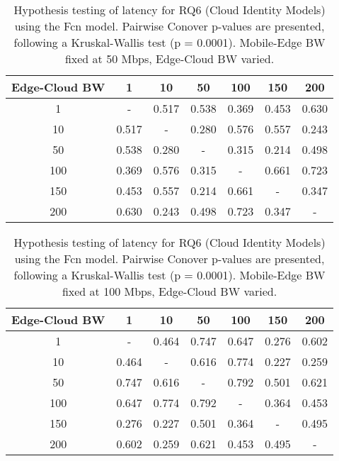 \begin{table}[H]
\caption{Hypothesis testing of latency for RQ6 (Cloud Identity Models) using the Fcn model. Pairwise Conover p-values are presented, following a Kruskal-Wallis test (p = 0.0001). Mobile-Edge BW fixed at 50 Mbps, Edge-Cloud BW varied.}
\centering
\begin{tabular}{c|cccccc}
Edge-Cloud BW & 1 & 10 & 50 & 100 & 150 & 200 \\
\hline
1 & - & 0.517 & 0.538 & 0.369 & 0.453 & 0.630 \\
10 & 0.517 & - & 0.280 & 0.576 & 0.557 & 0.243 \\
50 & 0.538 & 0.280 & - & 0.315 & 0.214 & 0.498 \\
100 & 0.369 & 0.576 & 0.315 & - & 0.661 & 0.723 \\
150 & 0.453 & 0.557 & 0.214 & 0.661 & - & 0.347 \\
200 & 0.630 & 0.243 & 0.498 & 0.723 & 0.347 & - \\
\end{tabular}
\end{table}

\begin{table}[H]
\caption{Hypothesis testing of latency for RQ6 (Cloud Identity Models) using the Fcn model. Pairwise Conover p-values are presented, following a Kruskal-Wallis test (p = 0.0001). Mobile-Edge BW fixed at 100 Mbps, Edge-Cloud BW varied.}
\centering
\begin{tabular}{c|cccccc}
Edge-Cloud BW & 1 & 10 & 50 & 100 & 150 & 200 \\
\hline
1 & - & 0.464 & 0.747 & 0.647 & 0.276 & 0.602 \\
10 & 0.464 & - & 0.616 & 0.774 & 0.227 & 0.259 \\
50 & 0.747 & 0.616 & - & 0.792 & 0.501 & 0.621 \\
100 & 0.647 & 0.774 & 0.792 & - & 0.364 & 0.453 \\
150 & 0.276 & 0.227 & 0.501 & 0.364 & - & 0.495 \\
200 & 0.602 & 0.259 & 0.621 & 0.453 & 0.495 & - \\
\end{tabular}
\end{table}

